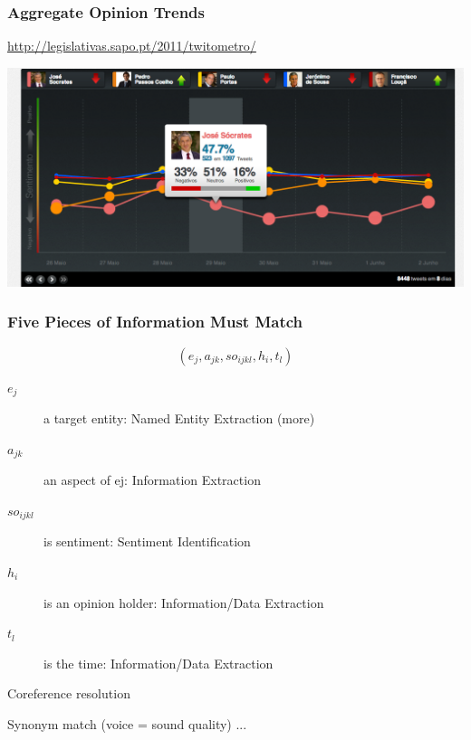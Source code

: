 \documentclass[t]{beamer}
\begin{document}
\begin{frame} \frametitle{Aggregate Opinion Trends} %

\begin{block}{\url{http://legislativas.sapo.pt/2011/twitometro/}} 

\begin{center}
     \includegraphics[width=\textwidth]{twitometro}
\end{center}

\end{block}

\end{frame} 




\begin{frame} \frametitle{Five Pieces of Information Must Match} %

\begin{equation*}
(e_j, a_{jk}, so_{ijkl}, h_i, t_l)     
\end{equation*}

\begin{description}
\item [$e_j$]  a target entity: Named Entity Extraction (more) 
\item [$a_{jk}$] an aspect of ej: Information Extraction 
\item [$so_{ijkl}$] is sentiment: Sentiment Identification 
\item [$h_i$] is an opinion holder: Information/Data Extraction 
\item [$t_l$] is the time: Information/Data Extraction 
\end{description}


Coreference resolution 

Synonym match (voice = sound quality) ...


\end{frame} 
\end{document}
